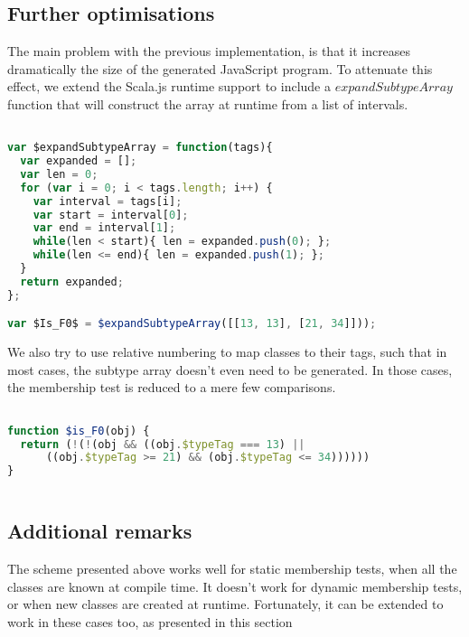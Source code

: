 \subsection{Further optimisations}
The main problem with the previous implementation, is that it increases
dramatically the size of the generated JavaScript program. To attenuate this
effect, we extend the Scala.js runtime support to include a
$expandSubtypeArray$ function that will construct the array at runtime from a
list of intervals.\\

\begin{lstlisting}[language=javascript,caption=Compressed subtype array,
label={lst:expandSubtypeArray}]

var $expandSubtypeArray = function(tags){
  var expanded = [];
  var len = 0;
  for (var i = 0; i < tags.length; i++) {
    var interval = tags[i];
    var start = interval[0];
    var end = interval[1];
    while(len < start){ len = expanded.push(0); };
    while(len <= end){ len = expanded.push(1); };
  }
  return expanded;
};

var $Is_F0$ = $expandSubtypeArray([[13, 13], [21, 34]]));
\end{lstlisting}

We also try to use relative numbering \cite{relativeNumbering} to map classes
to their tags, such that in most cases, the subtype array doesn't even need to
be generated. In those cases, the membership test is reduced to a mere few
comparisons.

\begin{lstlisting}[language=javascript,
caption=Constant folding of subtype array, 
label={lst:noSubtypeArray}]

function $is_F0(obj) {
  return (!(!(obj && ((obj.$typeTag === 13) || 
      ((obj.$typeTag >= 21) && (obj.$typeTag <= 34))))))
}
  
\end{lstlisting}

\subsection{Additional remarks}
The scheme presented above works well for static membership tests, when all the
classes are known at compile time. It doesn't work for dynamic membership
tests, or when new classes are created at runtime. Fortunately, it can be
extended to work in these cases too, as presented in this section

